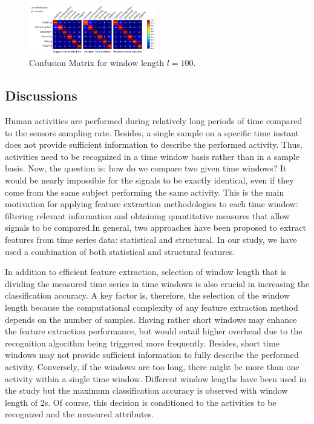 \documentclass[5p]{elsarticle}
\begin{document}
\begin{figure}[h!]
  \centering
  \begin{center}
    \includegraphics[width=0.5\textwidth]{Confusion_Matrix}
  \end{center}
  \vspace{-10pt}
  \caption{\label{cm_fig}Confusion Matrix for window length $l=100$.}
\end{figure}

\subsection{Discussions}
Human activities are performed during relatively long periods of time compared to the sensors sampling rate. Besides, a single sample on a specific time instant does not provide sufficient information to describe the performed activity. Thus, activities need to be recognized in a time window basis rather than in a sample basis. Now, the question is: how do we compare two given time windows? It would be nearly impossible for the signals to be exactly identical, even if they come from the same subject performing the same activity. This is the main motivation for applying feature extraction methodologies \cite{Guyon2003} \cite{Chen2006} to each time window: filtering relevant information and obtaining quantitative measures that allow signals to be compared.In general, two approaches have been proposed to extract features from time series data: statistical and structural. In our study, we have used a combination of both statistical and structural features.

In addition to efficient feature extraction, selection of window length that is dividing the measured time series in time windows is also crucial in increasing the classification accuracy. A key factor is, therefore, the selection of the window length because the computational complexity of any feature extraction method depends on the number of samples. Having rather short windows may enhance the feature extraction performance, but would entail higher overhead due to the recognition algorithm being triggered more frequently. Besides, short time windows may not provide sufficient information to fully describe the performed activity. Conversely, if the windows are too long, there might be more than one activity within a single time window. Different window lengths have been used in the study but the maximum classification accuracy is observed with window length of 2s. Of course, this decision is conditioned to the activities to be recognized and the measured attributes.
\end{document}
